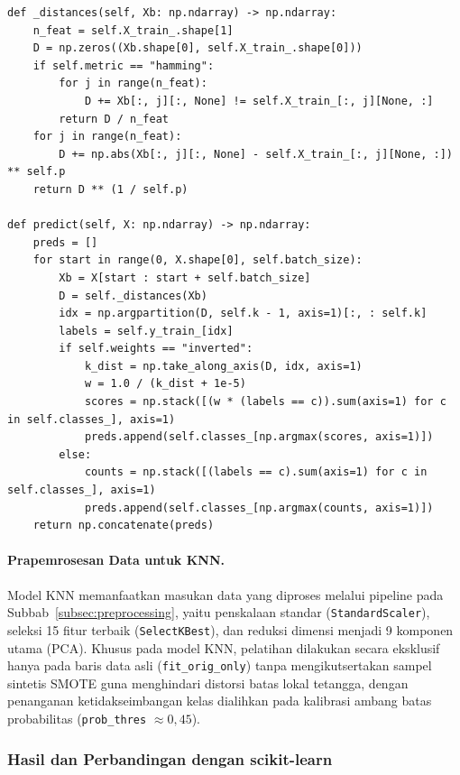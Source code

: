 \begin{lstlisting}[caption={Komputasi jarak berbasis batch dan inferensi pada kelas \texttt{KNN}.},label={lst:knn-core}]
def _distances(self, Xb: np.ndarray) -> np.ndarray:
    n_feat = self.X_train_.shape[1]
    D = np.zeros((Xb.shape[0], self.X_train_.shape[0]))
    if self.metric == "hamming":
        for j in range(n_feat):
            D += Xb[:, j][:, None] != self.X_train_[:, j][None, :]
        return D / n_feat
    for j in range(n_feat):
        D += np.abs(Xb[:, j][:, None] - self.X_train_[:, j][None, :]) ** self.p
    return D ** (1 / self.p)

def predict(self, X: np.ndarray) -> np.ndarray:
    preds = []
    for start in range(0, X.shape[0], self.batch_size):
        Xb = X[start : start + self.batch_size]
        D = self._distances(Xb)
        idx = np.argpartition(D, self.k - 1, axis=1)[:, : self.k]
        labels = self.y_train_[idx]
        if self.weights == "inverted":
            k_dist = np.take_along_axis(D, idx, axis=1)
            w = 1.0 / (k_dist + 1e-5)
            scores = np.stack([(w * (labels == c)).sum(axis=1) for c in self.classes_], axis=1)
            preds.append(self.classes_[np.argmax(scores, axis=1)])
        else:
            counts = np.stack([(labels == c).sum(axis=1) for c in self.classes_], axis=1)
            preds.append(self.classes_[np.argmax(counts, axis=1)])
    return np.concatenate(preds)
\end{lstlisting}

\paragraph{Prapemrosesan Data untuk KNN.}
Model KNN memanfaatkan masukan data yang diproses melalui pipeline pada Subbab~\ref{subsec:preprocessing},
yaitu penskalaan standar (\texttt{StandardScaler}), seleksi 15 fitur terbaik (\texttt{SelectKBest}),
dan reduksi dimensi menjadi 9 komponen utama (PCA). Khusus pada model KNN, pelatihan dilakukan
secara eksklusif hanya pada baris data asli (\texttt{fit\_orig\_only}) tanpa mengikutsertakan sampel
sintetis SMOTE guna menghindari distorsi batas lokal tetangga, dengan penanganan ketidakseimbangan
kelas dialihkan pada kalibrasi ambang batas probabilitas (\texttt{prob\_thres} $\approx 0{,}45$).

\subsubsection{Hasil dan Perbandingan dengan scikit-learn}

